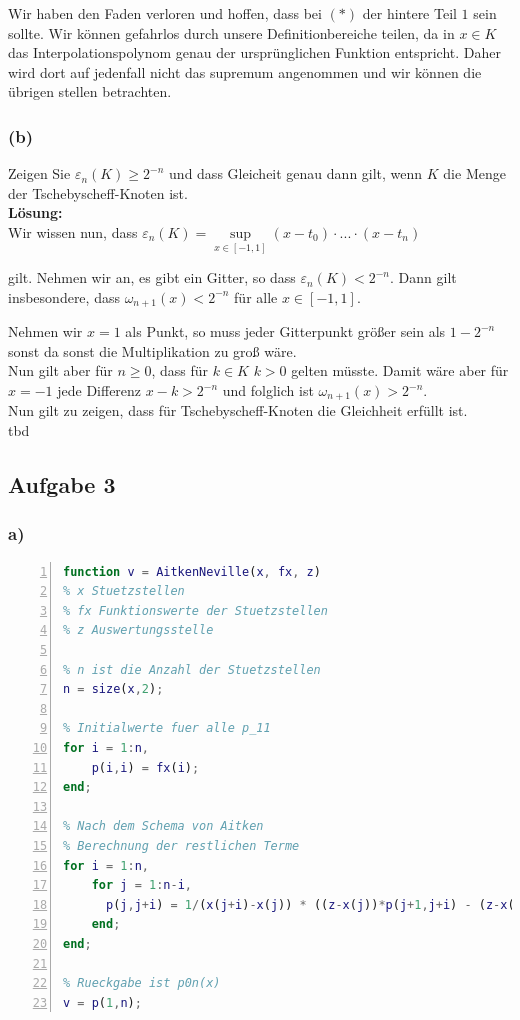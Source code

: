 \documentclass[11pt,a4paper,ngerman]{article}
\begin{document}
Wir haben den Faden verloren und hoffen, dass bei $(*)$ der hintere
Teil $1$ sein sollte. Wir können gefahrlos durch unsere Definitionbereiche
teilen, da in $x \in K$ das Interpolationspolynom genau der ursprünglichen
Funktion entspricht. Daher wird dort auf jedenfall nicht das supremum
angenommen und wir können die übrigen stellen betrachten.

\subsubsection*{(b)}

Zeigen Sie $\varepsilon_n(K) \geq 2^{-n}$ und dass Gleicheit genau dann gilt, wenn $K$ die Menge
der Tschebyscheff-Knoten ist.\\

\textbf{Lösung:}\\

Wir wissen nun, dass
$\varepsilon_n(K) = \underset{x \in [-1,1]}{\sup} (x-t_0)\cdot ... \cdot(x - t_n)$
  
gilt. Nehmen wir an, es gibt ein Gitter, so dass
$\varepsilon_n(K) < 2^{-n}$. Dann gilt insbesondere, dass
$\omega_{n+1} (x) < 2^{-n}$ für alle $x \in [-1,1]$.

Nehmen wir $x=1$ als Punkt, so muss jeder Gitterpunkt
größer sein als
$1-2^{-n}$ sonst da sonst die Multiplikation zu groß wäre.\\
Nun gilt aber für $n\geq0$, dass für $k \in K$ $k > 0$ gelten müsste.
Damit wäre aber für $x = -1$ jede Differenz $x-k > 2^{-n}$ und folglich
ist $\omega_{n+1}(x) > 2^{-n}$.\\

Nun gilt zu zeigen, dass für Tschebyscheff-Knoten die Gleichheit erfüllt ist.\\

tbd

\subsection*{Aufgabe 3}


\subsubsection*{a)}
\begin{lstlisting}[language=matlab,numbers=left]
function v = AitkenNeville(x, fx, z)
% x Stuetzstellen
% fx Funktionswerte der Stuetzstellen
% z Auswertungsstelle

% n ist die Anzahl der Stuetzstellen
n = size(x,2);

% Initialwerte fuer alle p_11
for i = 1:n,
    p(i,i) = fx(i);
end;

% Nach dem Schema von Aitken
% Berechnung der restlichen Terme
for i = 1:n,
    for j = 1:n-i,
      p(j,j+i) = 1/(x(j+i)-x(j)) * ((z-x(j))*p(j+1,j+i) - (z-x(j+i))*p(j,j+i-1));
    end;
end;

% Rueckgabe ist p0n(x)
v = p(1,n);
\end{lstlisting}
\end{document}
